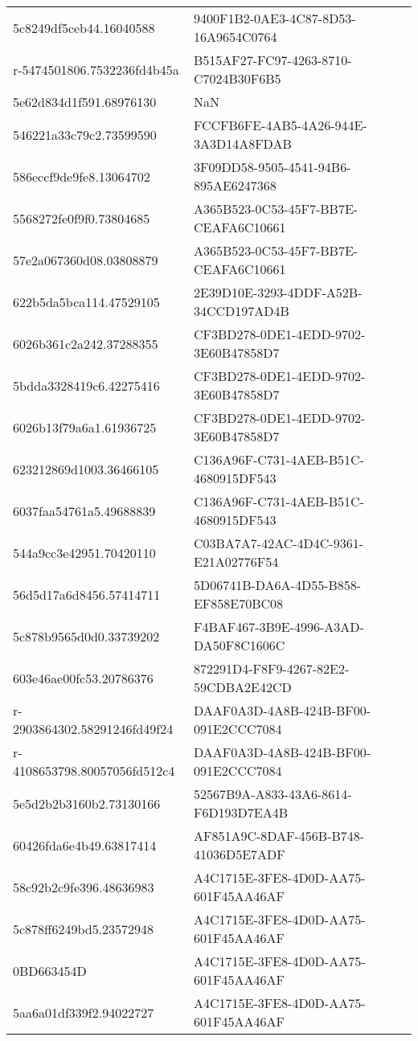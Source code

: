\begin{tabular}{ll}
5c8249df5ceb44.16040588 & 9400F1B2-0AE3-4C87-8D53-16A9654C0764 \\
r-5474501806.7532236fd4b45a & B515AF27-FC97-4263-8710-C7024B30F6B5 \\
5e62d834d1f591.68976130 & NaN \\
546221a33c79c2.73599590 & FCCFB6FE-4AB5-4A26-944E-3A3D14A8FDAB \\
586eccf9de9fe8.13064702 & 3F09DD58-9505-4541-94B6-895AE6247368 \\
5568272fe0f9f0.73804685 & A365B523-0C53-45F7-BB7E-CEAFA6C10661 \\
57e2a067360d08.03808879 & A365B523-0C53-45F7-BB7E-CEAFA6C10661 \\
622b5da5bca114.47529105 & 2E39D10E-3293-4DDF-A52B-34CCD197AD4B \\
6026b361c2a242.37288355 & CF3BD278-0DE1-4EDD-9702-3E60B47858D7 \\
5bdda3328419c6.42275416 & CF3BD278-0DE1-4EDD-9702-3E60B47858D7 \\
6026b13f79a6a1.61936725 & CF3BD278-0DE1-4EDD-9702-3E60B47858D7 \\
623212869d1003.36466105 & C136A96F-C731-4AEB-B51C-4680915DF543 \\
6037faa54761a5.49688839 & C136A96F-C731-4AEB-B51C-4680915DF543 \\
544a9cc3e42951.70420110 & C03BA7A7-42AC-4D4C-9361-E21A02776F54 \\
56d5d17a6d8456.57414711 & 5D06741B-DA6A-4D55-B858-EF858E70BC08 \\
5c878b9565d0d0.33739202 & F4BAF467-3B9E-4996-A3AD-DA50F8C1606C \\
603e46ae00fc53.20786376 & 872291D4-F8F9-4267-82E2-59CDBA2E42CD \\
r-2903864302.58291246fd49f24 & DAAF0A3D-4A8B-424B-BF00-091E2CCC7084 \\
r-4108653798.80057056fd512c4 & DAAF0A3D-4A8B-424B-BF00-091E2CCC7084 \\
5e5d2b2b3160b2.73130166 & 52567B9A-A833-43A6-8614-F6D193D7EA4B \\
60426fda6e4b49.63817414 & AF851A9C-8DAF-456B-B748-41036D5E7ADF \\
58c92b2c9fe396.48636983 & A4C1715E-3FE8-4D0D-AA75-601F45AA46AF \\
5c878ff6249bd5.23572948 & A4C1715E-3FE8-4D0D-AA75-601F45AA46AF \\
0BD663454D & A4C1715E-3FE8-4D0D-AA75-601F45AA46AF \\
5aa6a01df339f2.94022727 & A4C1715E-3FE8-4D0D-AA75-601F45AA46AF \\

\end{tabular}
